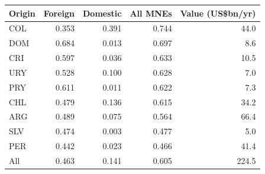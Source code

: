 \begin{tabular}{lrrrr}
\toprule
Origin & Foreign & Domestic & All MNEs & Value (US\$bn/yr) \\
\midrule
COL & 0.353 & 0.391 & 0.744 & 44.0 \\
DOM & 0.684 & 0.013 & 0.697 & 8.6 \\
CRI & 0.597 & 0.036 & 0.633 & 10.5 \\
URY & 0.528 & 0.100 & 0.628 & 7.0 \\
PRY & 0.611 & 0.011 & 0.622 & 7.3 \\
CHL & 0.479 & 0.136 & 0.615 & 34.2 \\
ARG & 0.489 & 0.075 & 0.564 & 66.4 \\
SLV & 0.474 & 0.003 & 0.477 & 5.0 \\
PER & 0.442 & 0.023 & 0.466 & 41.4 \\
\midrule
All & 0.463 & 0.141 & 0.605 & 224.5 \\
\bottomrule
\end{tabular}

